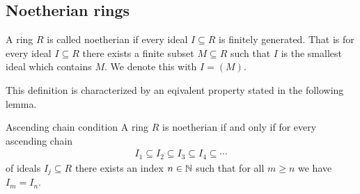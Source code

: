 \documentclass[../notes.tex]{subfiles}
\begin{document}
\subsection{Noetherian rings}

\begin{defi}{}{}
  A ring $R$ is called noetherian if every ideal $I \subseteq R$ is finitely generated.
  That is for every ideal $I \subseteq R$ there exists a finite subset $M \subseteq R$
  such that $I$ is the smallest ideal which contains $M$. We denote this with $I = (M)$.
\end{defi}

\smallskip
\noindent
This definition is characterized by an eqivalent property stated in the following lemma.

\smallskip
\begin{lemm}{Ascending chain condition}{}
  A ring $R$ is noetherian if and only if for every ascending chain
  \begin{align*}
    I_1 \subseteq I_2 \subseteq I_3 \subseteq I_4 \subseteq \cdots
  \end{align*}
  of ideals $I_j \subseteq R$ there exists an index $n \in {\mathbb{N}}$ such that for
  all $m \geq n$ we have $I_m = I_n$.
\end{lemm}
\end{document}
